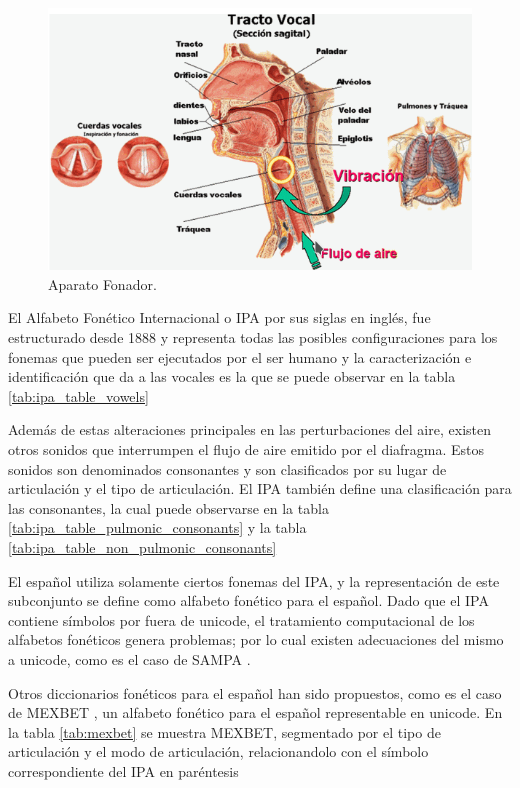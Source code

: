 \begin{figure}[H]
\caption{Aparato Fonador.}
\label{img:aparato_fonador}
\includegraphics[width=\textwidth]{imagenes/03_02_aparato_fonador.png}
\end{figure}

El Alfabeto Fonético Internacional o IPA por sus siglas en inglés, fue estructurado desde 1888 y representa todas las posibles configuraciones para los fonemas que pueden ser ejecutados por el ser humano y la caracterización e identificación que da a las vocales es la que se puede observar en la tabla \ref{tab:ipa_table_vowels}




Además de estas alteraciones principales en las perturbaciones del aire, existen otros sonidos que interrumpen el flujo de aire emitido por el diafragma. Estos sonidos son denominados consonantes y son clasificados por su lugar de articulación y el tipo de articulación. El IPA también define una clasificación para las consonantes, la cual puede observarse en la tabla \ref{tab:ipa_table_pulmonic_consonants} y la tabla \ref{tab:ipa_table_non_pulmonic_consonants}





El español utiliza solamente ciertos fonemas del IPA, y la representación de este subconjunto se define como alfabeto fonético para el español. Dado que el IPA contiene símbolos por fuera de unicode, el tratamiento computacional de los alfabetos fonéticos genera problemas; por lo cual existen adecuaciones del mismo a unicode, como es el caso de SAMPA \cite{SAMPA}. 

Otros diccionarios fonéticos para el español han sido propuestos, como es el caso de MEXBET \cite{mexbet}, un alfabeto fonético para el español representable en unicode. En la tabla \ref{tab:mexbet} se muestra MEXBET, segmentado por el tipo de articulación y el modo de articulación, relacionandolo con el símbolo correspondiente del IPA en paréntesis

